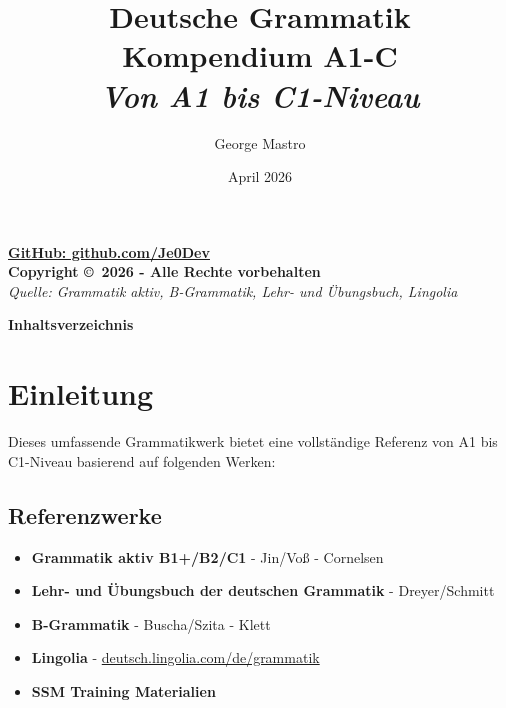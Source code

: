 \documentclass[11pt, a4paper]{book}
\title{\textbf{\Huge Deutsche Grammatik}\\
\Large \color{b1color}\textbf{Kompendium A1-C}\\
\textit{Von A1 bis C1-Niveau}}
\author{George Mastro}
\date{April 2026}
\begin{document}
\maketitle
\thispagestyle{empty}
\vspace{1cm}
\begin{center}
\Large\textbf{\color{primary}\href{https://github.com/Je0Dev}{GitHub: github.com/Je0Dev}}\\[0.5cm]
\Large\textbf{\color{accent}Copyright \copyright\ 2026 - Alle Rechte vorbehalten}\\[1cm]
\textit{Quelle: Grammatik aktiv, B-Grammatik, Lehr- und Übungsbuch, Lingolia}
\end{center}
\newpage

\begin{center}
\textbf{\LARGE\color{primary}Inhaltsverzeichnis}\\[0.5cm]
\tableofcontents
\end{center}
\newpage

\frontmatter
\chapter{Einleitung}
Dieses umfassende Grammatikwerk bietet eine vollständige Referenz von A1 bis C1-Niveau basierend auf folgenden Werken:

\section{Referenzwerke}
\begin{itemize}
    \item \textbf{\color{b1color}Grammatik aktiv B1+/B2/C1} - Jin/Voß - Cornelsen
    \item \textbf{\color{b1color}Lehr- und Übungsbuch der deutschen Grammatik} - Dreyer/Schmitt
    \item \textbf{\color{b1color}B-Grammatik} - Buscha/Szita - Klett
    \item \textbf{\color{b1color}Lingolia} - \href{https://deutsch.lingolia.com/de/grammatik}{deutsch.lingolia.com/de/grammatik}
    \item \textbf{\color{b1color}SSM Training Materialien}
\end{itemize}
\end{document}
